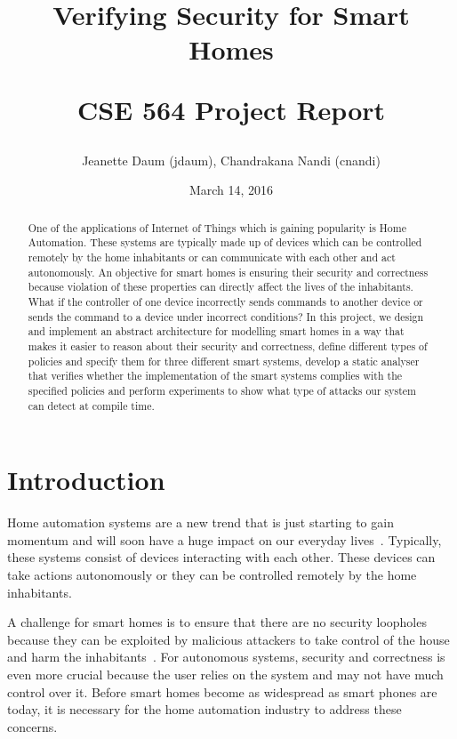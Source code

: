 \documentclass{article}
\title{\textbf{Verifying Security for Smart Homes} 
\\
\begin{center}
\large{CSE 564 Project Report}
\end{center}\vspace{-2ex}}
\author{Jeanette Daum (jdaum), Chandrakana Nandi (cnandi) }
\date{March 14, 2016}
\begin{document}
\maketitle
\begin{abstract}
One of the applications of Internet of Things which is gaining popularity is Home Automation. These systems are typically made up of devices which can be controlled remotely by the home inhabitants or can communicate with each other and act autonomously. An objective for smart homes is ensuring their security and correctness because violation of these properties can directly affect the lives of the inhabitants. What if the controller of one device incorrectly sends commands to another device or sends the command to a device under incorrect conditions? In this project, we design and implement an abstract architecture for modelling smart homes in a way that makes it easier to reason about their security and correctness, define different types of policies and specify them for three different smart systems, develop a static analyser that verifies whether the implementation of the smart systems complies with the specified policies and perform experiments to show what type of attacks our system can detect at compile time. 

\end{abstract}
\section{Introduction}
Home automation systems are a new trend that is just starting to gain momentum and will soon have a huge impact on our everyday lives~\cite{samsung, homekit, echo, wink, homeos}. Typically, these systems consist of devices interacting with each other. These devices can take actions autonomously or they can be controlled remotely by the home inhabitants. 


A challenge for smart homes is to ensure that there are no security loopholes because they can be exploited by malicious attackers to take control of the house and harm the inhabitants~\cite{yoshi, jung}. For autonomous systems, security and correctness is even more crucial because the user relies on the system and may not have much control over it. Before smart homes become as widespread as smart phones are today, it is necessary for the home automation industry to address these concerns.
\end{document}

